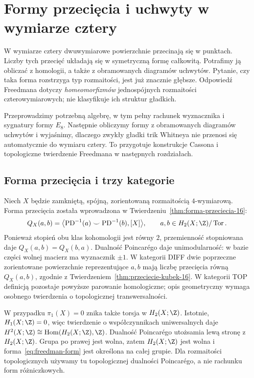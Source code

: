 \chapter{Formy przecięcia i uchwyty w wymiarze cztery}
\label{ch:freedman-formy}

W wymiarze cztery dwuwymiarowe powierzchnie przecinają
się w punktach. Liczby tych przecięć układają się w
symetryczną formę całkowitą. Potrafimy ją obliczać z
homologii, a także z obramowanych diagramów uchwytów.
Pytanie, czy taka forma rozstrzyga typ rozmaitości, jest
już znacznie głębsze. Odpowiedź Freedmana dotyczy
\emph{homeomorfizmów} jednospójnych rozmaitości
czterowymiarowych; nie klasyfikuje ich struktur gładkich.

Przeprowadzimy potrzebną algebrę, w tym pełny rachunek
wyznacznika i sygnatury formy $E_8$. Następnie
obliczymy formy z obramowanych diagramów uchwytów
i wyjaśnimy, dlaczego zwykły gładki trik Whitneya
nie przenosi się automatycznie do wymiaru cztery.
To przygotuje konstrukcje Cassona i topologiczne
twierdzenie Freedmana w następnych rozdziałach.

\section{Forma przecięcia i trzy kategorie}
\label{sec:freedman-form}

Niech $X$ będzie zamkniętą, spójną, zorientowaną
rozmaitością $4$-wymiarową. Forma przecięcia została
wprowadzona w Twierdzeniu~\ref{thm:forma-przeciecia-16}:
\begin{equation}\label{eq:freedman-form}
 Q_X(a,b)=\bigl\langle
  \operatorname{PD}^{-1}(a)\smile
  \operatorname{PD}^{-1}(b),[X]\bigr\rangle,
 \qquad a,b\in H_2(X;\Z)/\operatorname{Tor}.
\end{equation}
Ponieważ stopień obu klas kohomologii jest równy $2$,
przemienność stopniowana daje $Q_X(a,b)=Q_X(b,a)$.
Dualność Poincarégo daje unimodularność: w bazie części
wolnej macierz ma wyznacznik $\pm1$. W kategorii DIFF
dwie poprzeczne zorientowane powierzchnie reprezentujące
$a,b$ mają liczbę przecięcia równą $Q_X(a,b)$, zgodnie
z Twierdzeniem~\ref{thm:przeciecie-kubek-16}.
W kategorii TOP definicją pozostaje powyższe parowanie
homologiczne; opis geometryczny wymaga osobnego twierdzenia
o topologicznej transwersalności.

W przypadku $\pi_1(X)=0$ znika także torsja w $H_2(X;\Z)$.
Istotnie, $H_1(X;\Z)=0$, więc twierdzenie o współczynnikach
uniwersalnych daje
$H^2(X;\Z)\cong\operatorname{Hom}(H_2(X;\Z),\Z)$.
Dualność Poincarégo utożsamia lewą stronę z
$H_2(X;\Z)$. Grupa po prawej jest wolna, zatem
$H_2(X;\Z)$ jest wolna i forma~\eqref{eq:freedman-form}
jest określona na całej grupie. Dla rozmaitości
topologicznych używamy tu topologicznej dualności
Poincarégo, a nie rachunku form różniczkowych.

